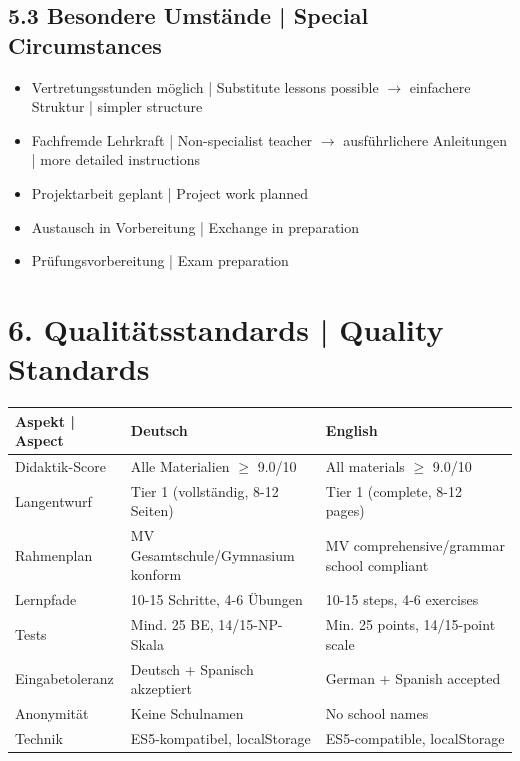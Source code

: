 \documentclass[11pt,a4paper]{article}
\begin{document}
\subsection*{5.3 Besondere Umstände | Special Circumstances}

\begin{itemize}[leftmargin=*, nosep]
    \item[$\square$] Vertretungsstunden möglich | Substitute lessons possible $\rightarrow$ einfachere Struktur | simpler structure
    \item[$\square$] Fachfremde Lehrkraft | Non-specialist teacher $\rightarrow$ ausführlichere Anleitungen | more detailed instructions
    \item[$\square$] Projektarbeit geplant | Project work planned
    \item[$\square$] Austausch in Vorbereitung | Exchange in preparation
    \item[$\square$] Prüfungsvorbereitung | Exam preparation
\end{itemize}

\section*{\textcolor{spanisch}{6. Qualitätsstandards | Quality Standards}}

\begin{tabularx}{\textwidth}{|l|X|X|}
\hline
\rowcolor{lightgray}
\textbf{Aspekt | Aspect} & \textbf{Deutsch} & \textbf{English} \\
\hline
Didaktik-Score &
Alle Materialien $\geq$ 9.0/10 &
All materials $\geq$ 9.0/10 \\
\hline
Langentwurf &
Tier 1 (vollständig, 8-12 Seiten) &
Tier 1 (complete, 8-12 pages) \\
\hline
Rahmenplan &
MV Gesamtschule/Gymnasium konform &
MV comprehensive/grammar school compliant \\
\hline
Lernpfade &
10-15 Schritte, 4-6 Übungen &
10-15 steps, 4-6 exercises \\
\hline
Tests &
Mind. 25 BE, 14/15-NP-Skala &
Min. 25 points, 14/15-point scale \\
\hline
Eingabetoleranz &
Deutsch + Spanisch akzeptiert &
German + Spanish accepted \\
\hline
Anonymität &
Keine Schulnamen &
No school names \\
\hline
Technik &
ES5-kompatibel, localStorage &
ES5-compatible, localStorage \\
\hline
\end{tabularx}
\end{document}
